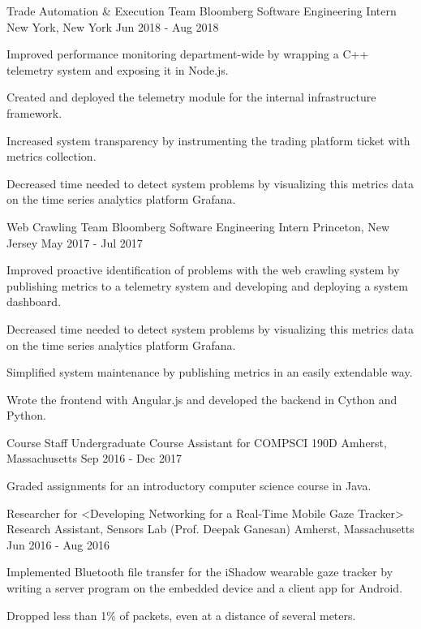 \begin{cventries}
    \cventry
    {Trade Automation \& Execution Team}
    {Bloomberg Software Engineering Intern}
    {New York, New York}
    {Jun 2018 - Aug 2018}
    {
      \begin{cvitems}
        \item {Improved performance monitoring department-wide by wrapping a C++ telemetry system and exposing it in Node.js.}
        \item {Created and deployed the telemetry module for the internal infrastructure framework.}
        \item {Increased system transparency by instrumenting the trading platform ticket with metrics collection.}
        \item {Decreased time needed to detect system problems by visualizing this metrics data on the time series analytics platform Grafana.}
      \end{cvitems} 
    }
    \cventry
    {Web Crawling Team}
    {Bloomberg Software Engineering Intern}
    {Princeton, New Jersey}
    {May 2017 - Jul 2017}
    {
      \begin{cvitems}
        \item {Improved proactive identification of problems with the web crawling system by publishing metrics to a telemetry system and developing and deploying a system dashboard.}
        \item {Decreased time needed to detect system problems by visualizing this metrics data on the time series analytics platform Grafana.}
        \item {Simplified system maintenance by publishing metrics in an easily extendable way.}
        \item {Wrote the frontend with Angular.js and developed the backend in Cython and Python.}
      \end{cvitems} 
    }

     \cventry
    {Course Staff}
    {Undergraduate Course Assistant for COMPSCI 190D}
    {Amherst, Massachusetts}
    {Sep 2016 - Dec 2017}
    {
      \begin{cvitems}
        \item {Graded assignments for an introductory computer science course in Java.}
      \end{cvitems} 
    }
    
      \cventry
    {Researcher for <Developing Networking for a Real-Time Mobile Gaze Tracker>}
    {Research Assistant, Sensors Lab (Prof. Deepak Ganesan)}
    {Amherst, Massachusetts}
    {Jun 2016 - Aug 2016}
    {
      \begin{cvitems}
        \item {Implemented Bluetooth file transfer for the iShadow wearable gaze tracker by writing a server program on the embedded device and a client app for Android.}
        \item {Dropped less than 1\% of packets, even at a distance of several meters.} 
      \end{cvitems} 
    }
  

\end{cventries}
